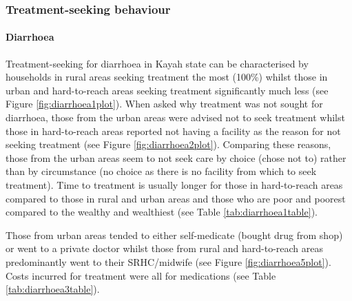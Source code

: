 \documentclass[12pt,a4paper]{article}
\let\oldparagraph\paragraph
\renewcommand{\paragraph}[1]{\oldparagraph{#1}\mbox{}}
\begin{document}
\hypertarget{ctreatment}{%
\subsubsection{Treatment-seeking behaviour}\label{ctreatment}}

\hypertarget{diarrhoea}{%
\paragraph{Diarrhoea}\label{diarrhoea}}

Treatment-seeking for diarrhoea in Kayah state can be characterised by households in rural areas seeking treatment the most (100\%) whilst those in urban and hard-to-reach areas seeking treatment significantly much less (see Figure \ref{fig:diarrhoea1plot}). When asked why treatment was not sought for diarrhoea, those from the urban areas were advised not to seek treatment whilst those in hard-to-reach areas reported not having a facility as the reason for not seeking treatment (see Figure \ref{fig:diarrhoea2plot}). Comparing these reasons, those from the urban areas seem to not seek care by choice (chose not to) rather than by circumstance (no choice as there is no facility from which to seek treatment). Time to treatment is usually longer for those in hard-to-reach areas compared to those in rural and urban areas and those who are poor and poorest compared to the wealthy and wealthiest (see Table \ref{tab:diarrhoea1table}).

Those from urban areas tended to either self-medicate (bought drug from shop) or went to a private doctor whilst those from rural and hard-to-reach areas predominantly went to their SRHC/midwife (see Figure \ref{fig:diarrhoea5plot}). Costs incurred for treatment were all for medications (see Table \ref{tab:diarrhoea3table}).
\end{document}
